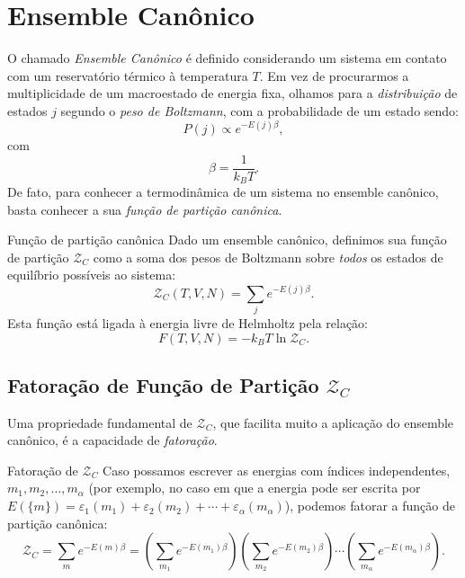 \chapter{Ensemble Canônico}

    O chamado \textit{Ensemble Canônico} é definido considerando um sistema em contato com um reservatório térmico à temperatura $T$. Em vez de procurarmos a multiplicidade de um macroestado de energia fixa, olhamos para a \textit{distribuição} de estados $j$ segundo o \textit{peso de Boltzmann}, com a probabilidade de um estado sendo:
    \begin{equation}
        P(j) \propto e^{-E(j)\beta},
    \end{equation}
    com \[\beta=\frac{1}{k_BT}.\] De fato, para conhecer a termodinâmica de um sistema no ensemble canônico, basta conhecer a sua \textit{função de partição canônica}.

    \begin{statementbox}{Função de partição canônica}
        Dado um ensemble canônico, definimos sua função de partição $\mathcal{Z}_C$ como a soma dos pesos de Boltzmann sobre \textit{todos} os estados de equilíbrio possíveis ao sistema:
        \begin{equation}
            \mathcal{Z}_C(T,V,N) = \sum_{j}e^{-E(j)\beta}.
        \end{equation}
        Esta função está ligada à energia livre de Helmholtz pela relação:
        \begin{equation}
            F(T,V,N)=-k_BT\ln\mathcal{Z}_C.
        \end{equation}
    \end{statementbox}

\section{Fatoração de Função de Partição \texorpdfstring{$\mathcal{Z}_C$}{Z\_C}}

    Uma propriedade fundamental de $\mathcal{Z}_C$, que facilita muito a aplicação do ensemble canônico, é a capacidade de \textit{fatoração}.

\begin{statementbox}{Fatoração de $\mathcal{Z}_C$}{}
    Caso possamos escrever as energias com índices independentes, $m_1,m_2,\dots,m_{\alpha}$ (por exemplo, no caso em que a energia pode ser escrita por $E(\lbrace m\rbrace)=\varepsilon_1(m_1)+\varepsilon_2(m_2)+\cdots+\varepsilon_{\alpha}(m_{\alpha})$), podemos fatorar a função de partição canônica:
    \begin{equation}
        \mathcal{Z}_C = \sum_{m}e^{-E(m)\beta}=\left(\sum_{m_1}e^{-E(m_1)\beta}\right)\left(\sum_{m_2}e^{-E(m_2)\beta}\right)\cdots\left(\sum_{m_{\alpha}}e^{-E(m_{\alpha})\beta}\right).
    \end{equation}
\end{statementbox}

